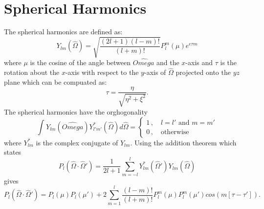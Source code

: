\section{Spherical Harmonics}\label{appdx:spherical}

The spherical harmonics are defined as:
\begin{equation}
Y_{lm}(\hat{\Omega}) = \sqrt{\frac{(2l+1)(l-m)!}{(l+m)!}}P_l^m(\mu)e^{e \tau m}
\end{equation}
where $\mu$ is the cosine of the angle between $\hat{Omega}$ and the $x$-axis and $\tau$ is the rotation about the $x$-axis with respect to the $y$-axis of $\hat{\Omega}$ projected onto the $yz$ plane which can be compuated as:
\begin{equation}
\tau = \frac{\eta}{\sqrt{\eta^2 + \xi^2}}.
\end{equation}
The spherical harmonics have the orghogonality
\begin{equation}
\int_{}^{}Y_{lm}(\hat{Omega})Y_{l'm'}^*(\hat{\Omega}) d\hat{\Omega}= 
\begin{cases}
1 \,, \quad l = l' \text{ and } m = m' \\
0 \,, \quad \text{otherwise}
\end{cases}
\end{equation}
where $Y_{lm}^*$ is the complex conjugate of $Y_{lm}$. Using the addition theorem which states
\begin{equation}
P_l(\hat{\Omega} \cdot \hat{\Omega}') = \frac{1}{2l+1}\sum_{m=-l}^{l}Y_{lm}^*(\hat{\Omega}') Y_{lm}(\hat{\Omega})
\end{equation}
gives
\begin{equation}
P_l(\hat{\Omega} \cdot \hat{\Omega}') = P_l(\mu)P_l(\mu') + 2\sum_{m=1}^{l}\frac{(l-m)!}{(l+m)!}P_l^m(\mu) P_l^m(\mu') cos(m[\tau - \tau']).
\end{equation}

\endinput
